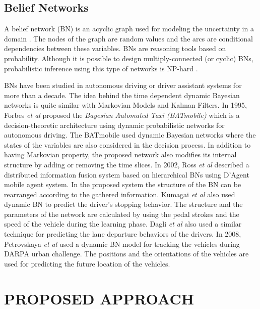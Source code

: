 \documentclass[letterpaper, 10 pt, conference]{ieeeconf}
\begin{document}
\subsection{Belief Networks}

A belief network (BN) is an acyclic graph used for modeling the uncertainty in a domain \cite{pearl1986fusion}. The nodes of the graph are random values and the arcs are conditional dependencies between these variables. BNs are reasoning tools based on probability. Although it is possible to design multiply-connected (or cyclic) BNs, probabilistic inference using this type of networks is NP-hard \cite{cooper1990computational}.

BNs have been studied in autonomous driving or driver assistant systems for more than a decade. The idea behind the time dependent dynamic Bayesian networks is quite similar with Markovian Models and Kalman Filters. In 1995, Forbes \textit{et al} \cite{forbes1995batmobile} proposed the \textit{Bayesian Automated Taxi (BATmobile)} which is a decision-theoretic architecture using dynamic probabilistic networks for autonomous driving. The BATmobile used dynamic Bayesian networks where the states of the variables are also considered in the decision process. In addition to having Markovian property, the proposed network also modifies its internal structure by adding or removing the time slices. In 2002, Ross \textit{et al} \cite{ross2002mobile} described a distributed information fusion system based on hierarchical BNs using D'Agent mobile agent system. In the proposed system the structure of the BN can be rearranged according to the gathered information. Kumagai \textit{et al} \cite{kumagai2003prediction} also used dynamic BN to predict the driver's stopping behavior. The structure and the parameters of the network are calculated by using the pedal strokes and the speed of the vehicle during the learning phase. Dagli \textit{et al} \cite{dagli2010action} also used a similar technique for predicting the lane departure behaviors of the drivers. In 2008, Petrovskaya \textit{et al} \cite{petrovskaya2008model} used a dynamic BN model for tracking the vehicles during DARPA urban challenge. The positions and the orientations of the vehicles are used for predicting the future location of the vehicles.

\section{PROPOSED APPROACH}
\label{sec:proposed}
\end{document}
